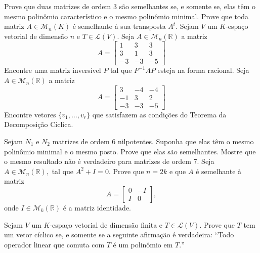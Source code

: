 \documentclass[11pt,a4paper]{article}
\begin{document}
     Prove que duas matrizes de ordem $3$ são semelhantes se, e somente se, elas têm o mesmo polinômio característico e o mesmo polinômio minimal.
 \solucao{}
     Prove que toda matriz $A \in \mathcal{M}_n(K)$ é semelhante à sua transposta $A^t.$
 \solucao{
 
 }
     Sejam $V$ um $K$-espaço vetorial de dimensão $n$ e $T \in \mathcal{L}(V).$
 \solucao{}
Seja $A \in \mathcal{M}_n(\mathbb{R})$ a matriz
\[
A = \begin{bmatrix}
1 & 3 & 3 \\
3 & 1 & 3 \\
-3 & -3 & -5
\end{bmatrix}
\]
Encontre uma matriz inversível $P$ tal que $P^{-1}AP$ esteja na forma racional.
 \solucao{}
     Seja $A \in \mathcal{M}_n(\mathbb{R})$ a matriz
\[
A = \begin{bmatrix}
3 & -4 & -4 \\
-1 & 3 & 2 \\
-3 & -3 & -5
\end{bmatrix}
\]
Encontre vetores $\{v_1, \ldots , v_r \}$ que satisfazem as condições do Teorema da Decomposição Cíclica.

 \solucao{}
     Sejam $N_1$ e $N_2$ matrizes de ordem $6$ nilpotentes. Suponha que elas têm o mesmo polinômio
minimal e o mesmo posto. Prove que elas são semelhantes. Mostre que o mesmo resultado não é verdadeiro para matrizes de ordem $7.$
 \solucao{
 
 }
     Seja $A \in \mathcal{M}_n(\mathbb{R}),$ tal que $A^2 + I = 0.$ Prove que $n = 2k$ e que $A$ é semelhante à matriz
    \[
    A = \begin{bmatrix}
    0 & -I \\
    I & 0
    \end{bmatrix},
    \]
    onde $I \in \mathcal{M}_k(\mathbb{R})$ é a matriz identidade.
\solucao{}

 Sejam $V$ um $K$-espaço vetorial de dimensão finita e $T \in \mathcal{L}(V).$ Prove que $T$ tem um vetor cíclico se, e somente se a seguinte afirmação é verdadeira: ``Todo operador linear que comuta com $T$ é um polinômio em $T.$''
\end{document}
